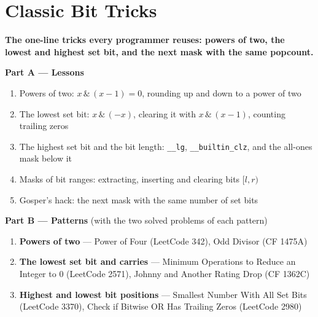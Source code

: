 \chapter{Classic Bit Tricks}
\label{ch:tricks}

\begin{tcolorbox}[enhanced, colback=white, colframe=secondaryblue, boxrule=1pt, arc=2mm]
\textbf{\large\textcolor{primaryblue}{The one-line tricks every programmer reuses: powers of two, the lowest and highest set bit, and the next mask with the same popcount.}}
\end{tcolorbox}


\begin{plannedbox}
\textbf{Part A --- Lessons}
\begin{enumerate}[leftmargin=*, label=\textbf{A\arabic*.}, itemsep=1pt]
    \item Powers of two: $x \,\&\, (x-1) = 0$, rounding up and down to a power of two
    \item The lowest set bit: $x \,\&\, (-x)$, clearing it with $x \,\&\, (x-1)$, counting trailing zeros
    \item The highest set bit and the bit length: \texttt{\_\_lg}, \texttt{\_\_builtin\_clz}, and the all-ones mask below it
    \item Masks of bit ranges: extracting, inserting and clearing bits $[l, r)$
    \item Gosper's hack: the next mask with the same number of set bits
\end{enumerate}
\textbf{Part B --- Patterns} (with the two solved problems of each pattern)
\begin{enumerate}[leftmargin=*, label=\textbf{P\arabic*.}, itemsep=1pt]
    \item \textbf{Powers of two} --- Power of Four {\small\color{darkgray}(LeetCode 342)}, Odd Divisor {\small\color{darkgray}(CF 1475A)}
    \item \textbf{The lowest set bit and carries} --- Minimum Operations to Reduce an Integer to 0 {\small\color{darkgray}(LeetCode 2571)}, Johnny and Another Rating Drop {\small\color{darkgray}(CF 1362C)}
    \item \textbf{Highest and lowest bit positions} --- Smallest Number With All Set Bits {\small\color{darkgray}(LeetCode 3370)}, Check if Bitwise OR Has Trailing Zeros {\small\color{darkgray}(LeetCode 2980)}
\end{enumerate}
\end{plannedbox}
